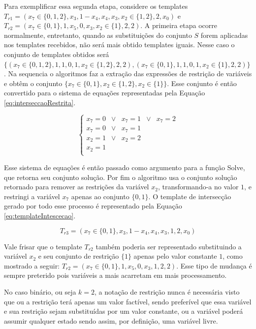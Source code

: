\documentclass[12pt,a4paper]{article}
\begin{document}
	Para exemplificar essa segunda etapa, considere os templates $T_{r1} = (x_7 \in \{0,1,2\},x_3,1-x_4,x_4,x_3,x_2 \in \{1,2\},2,x_0)$ e $T_{r2} = (x_7 \in \{0,1\},1,x_5,0,x_3,x_2 \in \{1\},2,2)$. A primeira etapa ocorre normalmente, entretanto, quando as substituições do conjunto $S$ forem aplicadas nos templates recebidos, não será mais obtido templates iguais. Nesse caso o conjunto de templates obtidos será $\{(x_7 \in \{0,1,2\}, 1, 1, 0, 1, x_2 \in \{1,2\}, 2, 2), (x_7 \in \{0,1\}, 1, 1, 0, 1, x_2 \in \{1\}, 2, 2)\}$. Na sequencia o algoritmos faz a extração das expressões de restrição de variáveis e obtêm o conjunto $\{x_7 \in \{0,1\}, x_2 \in \{1,2\}, x_2 \in \{1\} \}$. Esse conjunto é então convertido para o sistema de equações representadas pela Equação \ref{eq:interseccaoRestrita}.

	\begin{equation}
	\left\{\begin{matrix}
	x_7	  = 0 	& \vee &	x_7	=	1 & \vee &	x_7	= 2	\\ 
	x_7   = 0 	& \vee &	x_7	=	1					\\ 
	x_2   = 1 	& \vee &	x_2	=	2					\\ 
	x_2	  =	1											\\ 
	\end{matrix}\right.
	\label{eq:interseccaoRestrita}
	\end{equation}

	Esse sistema de equações é então passado como argumento para a função Solve, que retorna seu conjunto solução. Por fim o algoritmo usa o conjunto solução retornado para remover as restrições da variável $x_2$, transformando-a no valor $1$, e restringi a variável $x_7$ apenas ao conjunto $\{0,1\}$. O template de intersecção gerado por todo esse processo é representado pela Equação \ref{eq:templateIntescecao}.

	\begin{equation}
	T_{r3} = (x_7 \in \{0,1\}, x_3, 1-x_4, x_4, x_3, 1, 2, x_0)
	\label{eq:templateIntescecao}
	\end{equation}

	Vale frisar que o template $T_{r2}$ também poderia ser representado substituindo a variável $x_2$ e seu conjunto de restrição $\{1\}$ apenas pelo valor constante $1$, como mostrado a seguir: $T_{r2} = (x_7 \in \{0,1\}, 1, x_5, 0, x_3, 1, 2, 2)$. Esse tipo de mudança é sempre preterido pois variáveis a mais acarretam em mais processamento.

	No caso binário, ou seja $k = 2$, a notação de restrição nunca é necessária visto que ou a restrição terá apenas um valor factível, sendo preferível que essa variável e sua restrição sejam substituídas por um valor constante, ou a variável poderá assumir qualquer estado sendo assim, por definição, uma variável livre.
\end{document}
